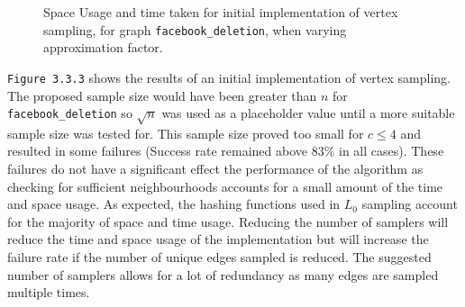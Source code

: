 \documentclass[11pt,twoside,a4paper]{report}
\begin{document}
\begin{figure}[H]
	\label{Figure 15}
	\caption{Space Usage and time taken for initial implementation of vertex sampling, for graph \texttt{facebook\_deletion}, when varying approximation factor.}
\end{figure}

\texttt{Figure 3.3.3} shows the results of an initial implementation of vertex sampling. The proposed sample size would have been greater than $n$ for \texttt{facebook\_deletion} so $\sqrt{n}$ was used as a placeholder value until a more suitable sample size was tested for. This sample size proved too small for $c\leq4$ and resulted in some failures (Success rate remained above $83\%$ in all cases). These failures do not have a significant effect the performance of the algorithm as checking for sufficient neighbourhoods accounts for a small amount of the time and space usage. As expected, the hashing functions used in $L_0$ sampling account for the majority of space and time usage. Reducing the number of samplers will reduce the time and space usage of the implementation but will increase the failure rate if the number of unique edges sampled is reduced. The suggested number of samplers allows for a lot of redundancy as many edges are sampled multiple times.
\end{document}
